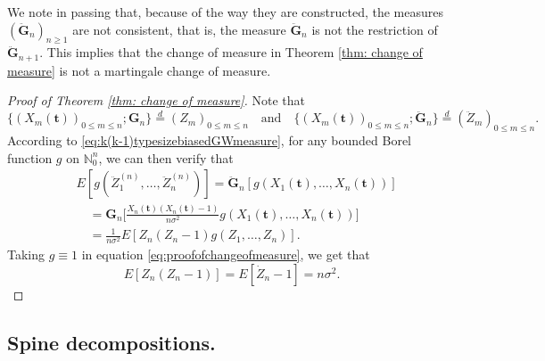 \documentclass[12pt,a4paper]{amsart}
\numberwithin{equation}{section}
\begin{document}
	We note in passing that, because of the way they are constructed, the measures $(\ddot{\mathbf G}_n)_{n\ge 1}$ are not consistent, that is, the measure $\ddot{\mathbf G}_n$ is not the restriction of $\ddot{\mathbf G}_{n+1}$.
	This implies that the change of measure in Theorem \ref{thm: change of measure} is not a martingale change of measure.
\medskip
\begin{proof}[Proof of Theorem \ref{thm: change of measure}]
    Note that 
    \[
    \{(X_m( \mathbf t ))_{0\le m\le n}; {\mathbf G}_n\}  \overset{d}{=} (Z_m)_{0\le m\le n}
\quad    \mbox{and} \quad \{(X_m( \mathbf t ))_{0\le m\le n};\ddot{\mathbf G}_n\}  \overset{d}{=} (\ddot Z_m)_{0\le m\le n}.
    \]
    According to \eqref{eq:k(k-1)typesizebiasedGWmeasure}, for any bounded Borel function $g$ on $\mathbb N_0^n$, we can then verify that
\begin{equation} \label{eq:proofofchangeofmeasure}
\begin{split}
	&E [ g ( \ddot Z_1^{(n)}, \dots, \ddot Z_n^{(n)})]
	= \ddot{\mathbf G}_n [g ( X_1(  \mathbf t ), \dots, X_n(  \mathbf t ))]
    \\ &\quad = {\mathbf G}_n \big[ \frac { X_n( \mathbf t ) ( X_n( \mathbf t ) - 1)} {n \sigma^2} g (X_1( \mathbf t ), \dots, X_n( \mathbf t ))\big]
	\\&\quad = \frac { 1} { n \sigma^2} E[ Z_n ( Z_n - 1) g( Z_1, \dots, Z_n)].
\end{split}
\end{equation}
	Taking $g\equiv 1$ in equation \eqref{eq:proofofchangeofmeasure}, we get that
\begin{equation}
	\label{eq: second moment}
	E [Z_n(Z_n-1)]= E [\dot Z_n - 1]= n\sigma^2.
\end{equation}
	\end{proof}

\subsection{Spine decompositions.}
\label{sec:spinesdecomposition}
\end{document}
